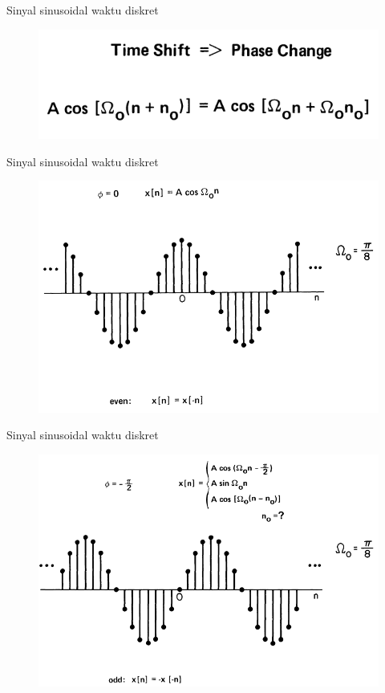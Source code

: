 \documentclass[pdflatex,compress,mathserif]{beamer}
\begin{document}
\begin{frame}{Sinyal sinusoidal waktu diskret}
	\begin{figure}
		\centering
		\includegraphics[height=0.3\textheight]{img/01.slide_06}
	\end{figure}
\end{frame}

\begin{frame}{Sinyal sinusoidal waktu diskret}
	\begin{figure}
		\centering
		\includegraphics[height=0.8\textheight]{img/01.slide_07}
	\end{figure}
\end{frame}

\begin{frame}{Sinyal sinusoidal waktu diskret}
	\begin{figure}
		\centering
		\includegraphics[height=0.8\textheight]{img/01.slide_08}
	\end{figure}
\end{frame}
\end{document}
